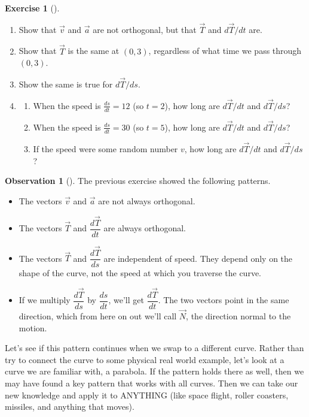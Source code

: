 \documentclass[10pt,]{book}
\theoremstyle{plain}
\theoremstyle{definition}
\theoremstyle{definition}
\newtheorem{observation}[theorem]{Observation}
\theoremstyle{definition}
\theoremstyle{definition}
\newtheorem{exploration}[project]{Exercise}
\theoremstyle{definition}
\numberwithin{equation}{section}
\begin{document}
\begin{exploration}[]\label{exploration-172}
\leavevmode%
\begin{enumerate}[font=\bfseries,label=(\alph*),ref=\alph*]
\item\label{task-417} Show that \(\vec v\) and \(\vec a\) are not orthogonal, but that \(\vec T\) and \(d\vec T/dt\) are.%
\item\label{task-418} Show that \(\vec T\) is the same at \((0,3)\), regardless of what time we pass through \((0,3)\).%
\item\label{task-419} Show the same is true for \(d\vec T/ds\).%
\item\label{task-420} \begin{enumerate}[font=\bfseries,label=(\roman*),ref=\theenumi.\roman*]
\item\label{task-421} When the speed is \(\frac{ds}{dt}=12\) (so \(t=2\)), how long are \(d\vec T/dt\) and \(d\vec T/ds\)?%
\item\label{task-422} When the speed is \(\frac{ds}{dt}=30\) (so \(t=5\)), how long are \(d\vec T/dt\) and \(d\vec T/ds\)?%
\item\label{task-423} If the speed were some random number \(v\), how long are \(d\vec T/dt\) and \(d\vec T/ds\)?%
\end{enumerate}
\end{enumerate}
\end{exploration}
\begin{observation}[]\label{curvature_observations}
The previous exercise showed the following patterns. \leavevmode%
\begin{itemize}[label=\textbullet]
\item{}The vectors \(\vec v\) and \(\vec a\) are not always orthogonal.%
\item{}The vectors \(\vec T\) and \(\dfrac{d\vec T}{dt}\) are always orthogonal.%
\item{}The vectors \(\vec T\) and \(\dfrac{d\vec T}{ds}\) are independent of speed. They depend only on the shape of the curve, not the speed at which you traverse the curve.%
\item{}If we multiply \(\dfrac{d\vec T}{ds}\) by \(\dfrac{ds}{dt}\), we'll get \(\dfrac{d\vec T}{dt}\). The two vectors point in the same direction, which from here on out we'll call \(\vec N\), the direction normal to the motion.%
\end{itemize}
%
\end{observation}
Let's see if this pattern continues when we swap to a different curve. Rather than try to connect the curve to some physical real world example, let's look at a curve we are familiar with, a parabola. If the pattern holds there as well, then we may have found a key pattern that works with all curves. Then we can take our new knowledge and apply it to ANYTHING (like space flight, roller coasters, missiles, and anything that moves).%
\end{document}
